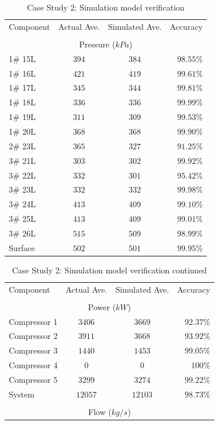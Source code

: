 \begin{appendices}
\begin{table}[h!]
		\label{Table: A verification}
	\end{table}
\begin{table}[h!]
	\caption{Case Study 2: Simulation model verification}
		\centering
		\begin{tabular}{lccr}
			\hline 
			Component & Actual Ave. & Simulated  Ave. & Accuracy \\ \hhline{====} 
			\\
		\multicolumn{4}{c}{Pressure ($ kPa $)}
		\\
		1\# 15L  & $ 394 $ & $ 384 $ & $ 98.55 $\% \\
		1\# 16L  & $ 421 $ & $ 419 $ & $ 99.61 $\% \\
		1\# 17L  & $ 345 $ & $ 344 $ & $ 99.81 $\% \\
		1\# 18L  & $ 336 $ & $ 336 $ & $ 99.99 $\% \\
		1\# 19L  & $ 311 $ & $ 309 $ & $ 99.53 $\% \\
		1\# 20L  & $ 368 $ & $ 368 $ & $ 99.90 $\% \\
		2\# 23L  & $ 365 $ & $ 327 $ & $ 91.25 $\% \\
		3\# 21L  & $ 303 $ & $ 302 $ & $ 99.92 $\% \\
		3\# 22L  & $ 332 $ & $ 301 $ & $ 95.42 $\% \\
		3\# 23L  & $ 332 $ & $ 332 $ & $ 99.98 $\% \\
		3\# 24L  & $ 413 $ & $ 409 $ & $ 99.10 $\% \\
		3\# 25L  & $ 413 $ & $ 409 $ & $ 99.01 $\% \\
		3\# 26L  & $ 515 $ & $ 509 $ & $ 98.99 $\% \\
		Surface & $ 502 $ & $ 501 $ & $ 99.95 $\% \\
		\hline 
	\end{tabular}

\label{Table: A verification2}
\end{table}

\newpage
\begin{table}[h!]
	\caption{Case Study 2: Simulation model verification continued}
	\centering
	\begin{tabular}{lccr}
		\hline 
		Component & Actual Ave. & Simulated  Ave. & Accuracy \\ \hhline{====} 
		\\
		\multicolumn{4}{c}{Power ($ kW $)}
		\\
		Compressor 1 & $ 3406 $ & $ 3669 $ & $ 92.37 $\% \\
		Compressor 2 & $ 3911 $ & $ 3668 $ & $ 93.92 $\% \\
		Compressor 3 & $ 1440 $ & $ 1453 $ & $ 99.05 $\% \\
		Compressor 4 & $  0   $ & $  0   $ & $ 100   $\% \\
		Compressor 5 & $ 3299 $ & $ 3274 $ & $ 99.22 $\% \\
		System       & $12057 $ & $12103 $ & $ 98.73 $\% \\
		\\
		\multicolumn{4}{c}{Flow ($ kg/s $)}
		\\
		

\end{tabular}
\end{table}
\end{appendices}
